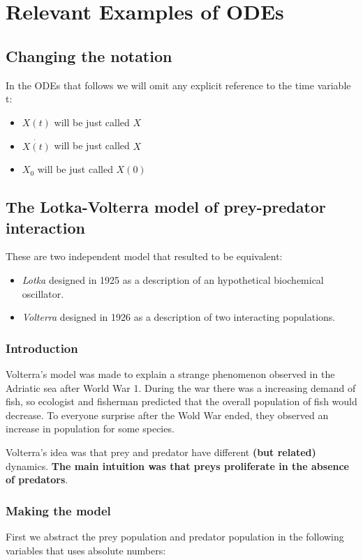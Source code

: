 \chapter{Relevant Examples of ODEs}

\section{Changing the notation}
In the ODEs that follows we will omit any explicit reference to the time variable t:

\begin{itemize}
    \item $X(t)$ will be just called $X$
    \item $\dot{X(t)}$ will be just called $X$
    \item $X_0$ will be just called $X(0)$
\end{itemize}

\section{The Lotka-Volterra model of prey-predator interaction}
These are two independent model that resulted to be equivalent:
\begin{itemize}
    \item \textit{Lotka} designed in 1925 as a description of an hypothetical biochemical oscillator.
    \item \textit{Volterra} designed in 1926 as a description of two interacting populations.
\end{itemize}

\subsection{Introduction}
Volterra's model was made to explain a strange phenomenon observed in the Adriatic sea after World War 1. During the war there was a increasing demand of fish, so ecologist and fisherman predicted that the overall population of fish would decrease. To everyone surprise after the Wold War ended, they observed an increase in population for some species.\par
Volterra's idea was that prey and predator have different \textbf{(but related)} dynamics. \textbf{The main intuition was that preys proliferate in the absence of predators}.\par

\subsection{Making the model}
First we abstract the prey population and predator population in the following variables that uses absolute numbers:

